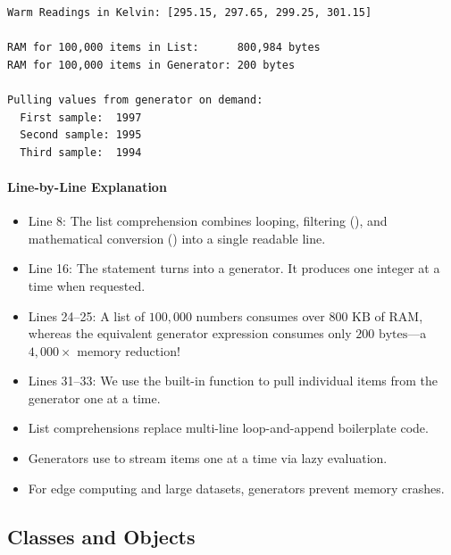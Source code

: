 \begin{lstlisting}[style=outputstyle]
Warm Readings in Kelvin: [295.15, 297.65, 299.25, 301.15]

RAM for 100,000 items in List:      800,984 bytes
RAM for 100,000 items in Generator: 200 bytes

Pulling values from generator on demand:
  First sample:  1997
  Second sample: 1995
  Third sample:  1994
\end{lstlisting}

\paragraph{Line-by-Line Explanation}
\begin{itemize}
    \item Line 8: The list comprehension combines looping, filtering (), and mathematical conversion () into a single readable line.
    \item Line 16: The  statement turns  into a generator. It produces one integer at a time when requested.
    \item Lines 24--25: A list of $100{,}000$ numbers consumes over $800\text{ KB}$ of RAM, whereas the equivalent generator expression consumes only $200\text{ bytes}$—a $4{,}000\times$ memory reduction!
    \item Lines 31--33: We use the built-in  function to pull individual items from the generator one at a time.
\end{itemize}

\begin{takeaways}
\begin{itemize}
    \item List comprehensions replace multi-line loop-and-append boilerplate code.
    \item Generators use  to stream items one at a time via lazy evaluation.
    \item For edge computing and large datasets, generators prevent memory crashes.
\end{itemize}
\end{takeaways}

\subsection{Classes and Objects}

